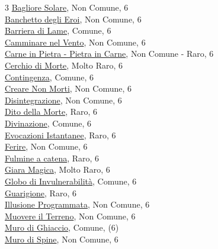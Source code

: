 \begin{multicols}{3}
{{\hyperlink{Bagliore Solare}{Bagliore Solare}, Non Comune, 6\\
\hyperlink{Banchetto degli Eroi}{Banchetto degli Eroi}, Non Comune, 6\\
\hyperlink{Barriera di Lame}{Barriera di Lame}, Comune, 6\\
\hyperlink{Camminare nel Vento}{Camminare nel Vento}, Non Comune, 6\\
\hyperlink{Carne in Pietra}{Carne in Pietra - Pietra in Carne}, Non Comune - Raro, 6\\
\hyperlink{Cerchio di Morte}{Cerchio di Morte}, Molto Raro, 6\\
\hyperlink{Contingenza}{Contingenza}, Comune, 6\\
\hyperlink{Creare Non Morti}{Creare Non Morti}, Non Comune, 6\\
\hyperlink{Disintegrazione}{Disintegrazione}, Non Comune, 6\\
\hyperlink{Dito della Morte}{Dito della Morte}, Raro, 6\\
\hyperlink{Divinazione}{Divinazione}, Comune, 6\\
\hyperlink{Evocazioni Istantanee}{Evocazioni Istantanee}, Raro, 6\\
\hyperlink{Ferire}{Ferire}, Non Comune, 6\\
\hyperlink{Fulmine a catena}{Fulmine a catena}, Raro, 6\\
\hyperlink{Giara Magica}{Giara Magica}, Molto Raro, 6\\
\hyperlink{Globo di Invulnerabilità}{Globo di Invulnerabilità}, Comune, 6\\
\hyperlink{Guarigione}{Guarigione}, Raro, 6\\
\hyperlink{Illusione Programmata}{Illusione Programmata}, Non Comune, 6\\
\hyperlink{Muovere il Terreno}{Muovere il Terreno}, Non Comune, 6\\
\hyperlink{Muro di Ghiaccio}{Muro di Ghiaccio}, Comune, (6)\\
\hyperlink{Muro di Spine}{Muro di Spine}, Non Comune, 6\\
}}
\end{multicols}
